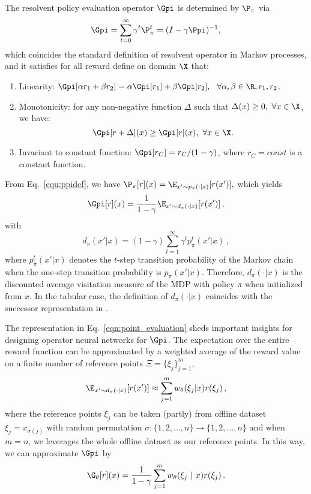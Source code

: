 \begin{pro}\label{pro:property_gpi}
The resolvent policy evaluation operator
$\Gpi$ is determined by $\P_\pi$ via
\begin{equation}\label{equ:res}
    \Gpi  = \sum_{t=0}^\infty \gamma^t \P_\pi^t = (I-\gamma \Ppi)^{-1},
\end{equation}
which coincides the standard definition of resolvent operator in Markov processes, 
and it satisfies for all reward define on domain $\X$ that: 
    \begin{enumerate}
        \item Linearity: $\Gpi[\alpha r_1 + \beta r_2] = \alpha \Gpi[r_1] + \beta \Gpi[r_2],$ $~\forall \alpha, \beta \in \R, r_1, r_2$. 
        \item Monotonicity: for any non-negative function $\Delta$ such that $\Delta(x)\geq 0,~\forall x\in \X$,
        we have:
        $$
            \Gpi[r+\Delta](x) \geq \Gpi[r](x),~\forall x\in \X.
        $$
        \item Invariant to constant function: $\Gpi[r_C] = r_C/(1-\gamma)$, where $r_C = const$ is a constant function. %
    \end{enumerate}
\end{pro}

From Eq.~\eqref{equ:ppidef}, we have $\P_\pi[r](x)=\E_{x'\sim p_\pi(\cdot|x)}[r(x')],$
which yields 
\begin{align}\label{eqn:point_evaluation}
    \Gpi[r](x) = \frac{1}{1-\gamma}\E_{x'\sim d_\pi(\cdot|x)}[r(x')]\,,
\end{align}
with
\begin{equation}\label{eqn:def_dpi}
    d_\pi(x'|x) =(1-\gamma) \sum_{t=1}^{\infty} \gamma^t p_{\pi}^t(x'|x)\,,
\end{equation}
where $p_\pi^{t}(x
'|x)$ denotes the $t$-step transition probability of the Markov chain when the one-step transition probability is $p_\pi(x'|x)$.  %
 Therefore, $d_\pi(\cdot|x)$ is the discounted average visitation measure of the MDP with policy $\pi$ when initialized from $x$. %
In the tabular case, 
the definition of $d_\pi(\cdot|x)$ coincides with the successor representation in  \citet{dayan1993improving}. 

The representation in Eq.~\eqref{eqn:point_evaluation} sheds important insights for designing operator neural networks for $\Gpi$.  
The expectation over the entire reward function can be approximated by 
a weighted average of the reward value on a finite number of reference points $\Xi = \{\xi_j\}_{j=1}^m$, 
$$
\E_{x'\sim d_\pi(\cdot|x)}[r(x')] 
\approx \sum_{j=1}^m  w_\theta(\xi_j|x) r(\xi_j)\,,
$$
where the reference points $\xi_j$ can be taken (partly) from offline dataset $\xi_j = x_{\sigma(j)}$ 
with random permutation $\sigma\colon \{1,2,\ldots,n\} \to \{1,2,\ldots,n\}$ and when $m = n$, we leverages the whole offline dataset as our reference points.
In this way, we can approximate $\Gpi$ by 
\begin{equation}\label{eqn:design_gpi}
    \G_\theta[r](x) = \frac{1}{1-\gamma}\sum_{j=1}^m 
{w}_\theta({\xi_j}~|~x) r(\xi_j)\,.
\end{equation}


